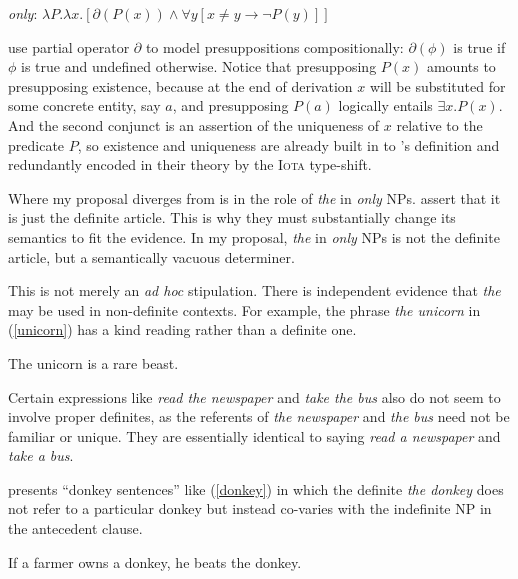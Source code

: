\begin{exe}
	\ex \label{only-lf} \textit{only}: $ \lambda P . \lambda x . [ \partial(P(x)) \land \forall y [ x \ne y \to \neg P(y) ] ] $
\end{exe}

\citeauthor{cb2015} use  partial operator $\partial$ to model presuppositions compositionally: $\partial(\phi)$ is true if $\phi$ is true and undefined otherwise. Notice that presupposing $P(x)$ amounts to presupposing existence, because at the end of derivation $x$ will be substituted for some concrete entity, say $a$, and presupposing $P(a)$ logically entails $\exists x . P(x)$. And the second conjunct is an assertion of the uniqueness of $x$ relative to the predicate $P$, so existence and uniqueness are already built in to \citeauthor{cb2015}'s definition and redundantly encoded in their theory by the \textsc{Iota} type-shift.

Where my proposal diverges from  is in the role of \textit{the} in \textit{only} NPs. \citeauthor{cb2015} assert that it is just the definite article. This is why they must substantially change its semantics to fit the evidence. In my proposal, \textit{the} in \textit{only} NPs is not the definite article, but a semantically vacuous determiner.

This is not merely an \textit{ad hoc} stipulation. There is independent evidence that \textit{the} may be used in non-definite contexts. For example, the phrase \textit{the unicorn} in (\ref{unicorn}) has a kind reading rather than a definite one.

\begin{exe}
	\ex \label{unicorn} The unicorn is a rare beast.
\end{exe}

Certain expressions like \textit{read the newspaper} and \textit{take the bus} also do not seem to involve proper definites, as the referents of \textit{the newspaper} and \textit{the bus} need not be familiar or unique. They are essentially identical to saying \textit{read a newspaper} and \textit{take a bus}.

\citet{schwarz09} presents ``donkey sentences'' like (\ref{donkey}) in which the definite \textit{the donkey} does not refer to a particular donkey but instead co-varies with the indefinite NP in the antecedent clause.

\begin{exe}
	\ex \label{donkey} If a farmer owns a donkey, he beats the donkey.
\end{exe}

